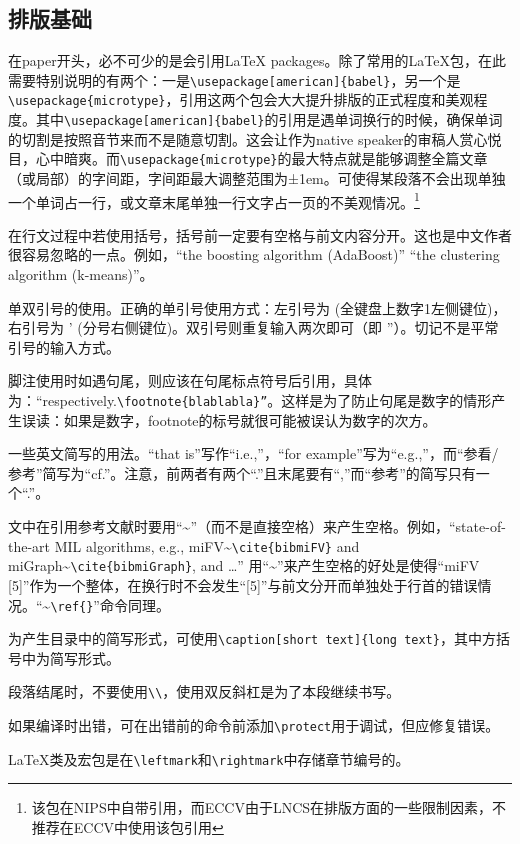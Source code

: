 \documentclass[11pt]{ctexart}
\begin{document}
\subsection{排版基础}
在paper开头，必不可少的是会引用LaTeX packages。除了常用的\LaTeX 包，在此需要特别说明的有两个：一是\verb|\usepackage[american]{babel}|，另一个是\verb|\usepackage{microtype}|，引用这两个包会大大提升排版的正式程度和美观程度。其中\verb|\usepackage[american]{babel}|的引用是遇单词换行的时候，确保单词的切割是按照音节来而不是随意切割。这会让作为native speaker的审稿人赏心悦目，心中暗爽。而\verb|\usepackage{microtype}|的最大特点就是能够调整全篇文章（或局部）的字间距，字间距最大调整范围为±1em。可使得某段落不会出现单独一个单词占一行，或文章末尾单独一行文字占一页的不美观情况。\footnote{该包在NIPS中自带引用，而ECCV由于LNCS在排版方面的一些限制因素，不推荐在ECCV中使用该包引用}

在行文过程中若使用括号，括号前一定要有空格与前文内容分开。这也是中文作者很容易忽略的一点。例如，“the boosting algorithm (AdaBoost)” “the clustering algorithm (k-means)”。

单双引号的使用。正确的单引号使用方式：左引号为 (全键盘上数字1左侧键位)，右引号为 ' (分号右侧键位)。双引号则重复输入两次即可（即 ''）。切记不是平常引号的输入方式。

脚注使用时如遇句尾，则应该在句尾标点符号后引用，具体为：“respectively.\verb|\footnote{blablabla}”|。这样是为了防止句尾是数字的情形产生误读：如果是数字，footnote的标号就很可能被误认为数字的次方。

一些英文简写的用法。“that is”写作“i.e.,”，“for example”写为“e.g.,”，而“参看/参考”简写为“cf.”。注意，前两者有两个“.”且末尾要有“,”而“参考”的简写只有一个“.”。

文中在引用参考文献时要用“\~{}”（而不是直接空格）来产生空格。例如，“state-of-the-art MIL algorithms, e.g., miFV\~{}\verb|\cite{bibmiFV}| and miGraph\~{}\verb|\cite{bibmiGraph}|, and …” 用“\~{}”来产生空格的好处是使得“miFV [5]”作为一个整体，在换行时不会发生“[5]”与前文分开而单独处于行首的错误情况。“\~{}\verb|\ref{}|”命令同理。

为产生目录中的简写形式，可使用\verb|\caption[short text]{long text}|，其中方括号中为简写形式。

段落结尾时，不要使用\verb|\\|，使用双反斜杠是为了本段继续书写。

如果编译时出错，可在出错前的命令前添加\verb|\protect|用于调试，但应修复错误。

\LaTeX 类及宏包是在\verb|\leftmark|和\verb|\rightmark|中存储章节编号的。
\end{document}

